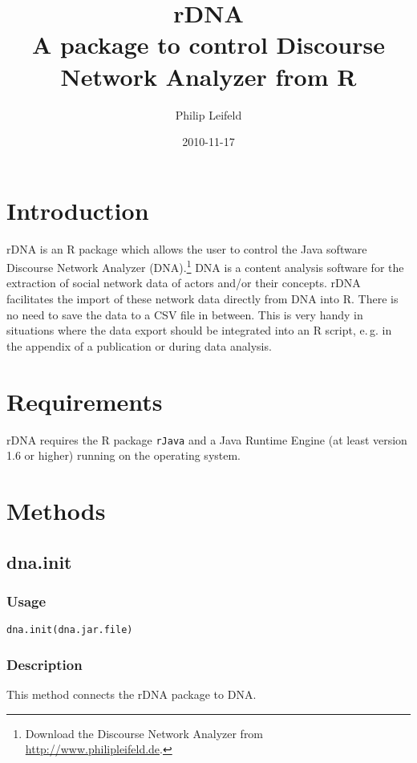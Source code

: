 \documentclass[a4paper, 10pt]{article}
\begin{document}
\title{rDNA\vspace{0.3cm}\\\normalsize{A package to control Discourse Network Analyzer from R}}
\author{Philip Leifeld}
\date{2010-11-17}

\maketitle

\tableofcontents

\section{Introduction}
rDNA is an R package which allows the user to control the Java software Discourse Network Analyzer (DNA).\footnote{Download the Discourse Network Analyzer from \url{http://www.philipleifeld.de}.} DNA is a content analysis software for the extraction of social network data of actors and/or their concepts. rDNA facilitates the import of these network data directly from DNA into R. There is no need to save the data to a CSV file in between. This is very handy in situations where the data export should be integrated into an R script, e.\,g. in the appendix of a publication or during data analysis.

\section{Requirements}
rDNA requires the R package \texttt{rJava} and a Java Runtime Engine (at least version 1.6 or higher) running on the operating system.

\section{Methods}

\subsection{dna.init}
\subsubsection*{Usage}
\begin{verbatim}
dna.init(dna.jar.file)
\end{verbatim}
\subsubsection*{Description}
This method connects the rDNA package to DNA.
\end{document}
